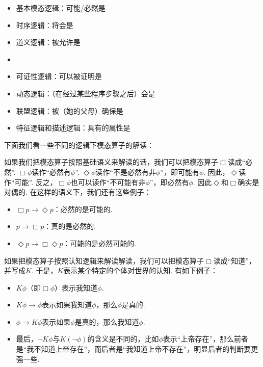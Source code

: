 \begin{itemize}
    \item {}基本模态逻辑：可能/必然是
    \item {}时序逻辑：将会是
    \item {}道义逻辑：被允许是
    \item {}
    \item {}可证性逻辑：可以被证明是
    \item {}动态逻辑：（在经过某些程序步骤之后）会是
    \item {}联盟逻辑：被（她的父母）确保是
    \item {}特征逻辑和描述逻辑：具有的属性是
\end{itemize}

下面我们看一些不同的逻辑下模态算子的解读：

\begin{example}[基础语义]
如果我们把模态算子按照基础语义来解读的话，我们可以把模态算子$\Box$读成“必然”. $\Box\phi$读作“必然有$\phi$”. $\Diamond\phi$读作“不是必然有非$\phi$”，即可能有$\phi$. 因此，$\Diamond$读作“可能”. 反之，$\Box\phi$也可以读作“不可能有非$\phi$”，即必然有$\phi$. 因此$\Diamond$和$\Box$确实是对偶的. 在这样的语义下，我们还有这些例子：
\begin{itemize}
    \item $\Box p\to\Diamond p$：必然的是可能的.
    \item $p\to\Box p$：真的是必然的.
    \item $\Diamond p\to\Box\Diamond p$：可能的是必然可能的.
\end{itemize}
\end{example}

\begin{example}[认知语义]
    如果把模态算子按照认知逻辑来解读解读，我们可以把模态算子$\Box$读成“知道”，并写成$K$. 于是，$K$表示某个特定的个体对世界的认知. 有如下例子：
    \begin{itemize}
        \item $K\phi$（即$\Box\phi$）表示我知道$\phi$. 
        \item $K\phi\to\phi$表示如果我知道$\phi$，那么$\phi$是真的. 
        \item $\phi\to K\phi$表示如果$\phi$是真的，那么我知道$\phi$. 
        \item 最后，$\neg K\phi$与$K(\neg\phi)$的含义是不同的，比如$\phi$表示“上帝存在”，那么前者是“我不知道上帝存在”，而后者是“我知道上帝不存在”，明显后者的判断要更强一些.
\end{itemize}
\end{example}

